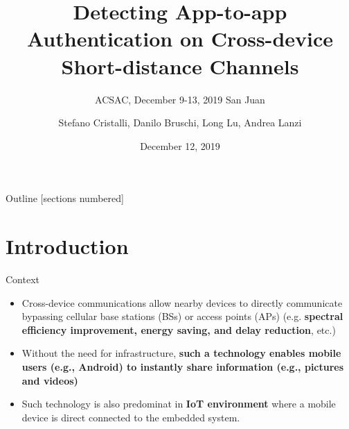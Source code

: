 \documentclass[10pt]{beamer}
\title{Detecting App-to-app Authentication on Cross-device
  Short-distance Channels}
\subtitle{ACSAC, December 9-13, 2019 San Juan}
\date{December 12, 2019}
\author{Stefano Cristalli, Danilo Bruschi, Long Lu, Andrea Lanzi}
\institute{University of Milan Italy, Northeastern University Boston US}
\begin{document}
\maketitle 

\begin{frame}{Outline}
  [sections numbered]
  \tableofcontents[hideallsubsections]
\end{frame}

\section{Introduction}
\begin{frame}[fragile]{Context}
  \begin{itemize}

  \item Cross-device communications allow nearby devices to directly
    communicate bypassing cellular base stations (BSs) or access
    points (APs) (e.g. {\bf spectral efficiency improvement, energy
      saving, and delay reduction}, etc.)

  \item Without the need for infrastructure, {\bf such a technology
      enables mobile users (e.g., Android) to instantly share
      information (e.g., pictures and videos)}

  \item Such technology is also predominat in {\bf IoT environment}
    where a mobile device is direct connected to the embedded system.

  \end{itemize}

 \end{frame}
\end{document}
